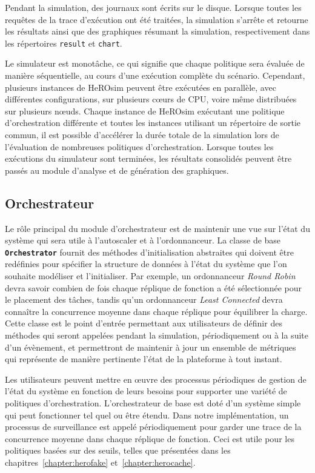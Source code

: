 Pendant la simulation, des journaux sont écrits sur le disque. Lorsque toutes les requêtes de la trace d'exécution ont été traitées, la simulation s'arrête et retourne les résultats ainsi que des graphiques résumant la simulation, respectivement dans les répertoires \texttt{result} et \texttt{chart}.

Le simulateur est monotâche, ce qui signifie que chaque politique sera évaluée de manière séquentielle, au cours d'une exécution complète du scénario. Cependant, plusieurs instances de HeROsim peuvent être exécutées en parallèle, avec différentes configurations, sur plusieurs cœurs de \gls{CPU}, voire même distribuées sur plusieurs nœuds. Chaque instance de HeROsim exécutant une politique d'orchestration différente et toutes les instances utilisant un répertoire de sortie commun, il est possible d'accélérer la durée totale de la simulation lors de l'évaluation de nombreuses politiques d'orchestration. Lorsque toutes les exécutions du simulateur sont terminées, les résultats consolidés peuvent être passés au module d'analyse et de génération des graphiques.

\subsection{Orchestrateur}

Le rôle principal du module d'orchestrateur est de maintenir une vue sur l'état du système qui sera utile à l'autoscaler et à l'ordonnanceur. La classe de base \textbf{\texttt{Orchestrator}} fournit des méthodes d'initialisation abstraites qui doivent être redéfinies pour spécifier la structure de données à l'état du système que l'on souhaite modéliser et l'initialiser. Par exemple, un ordonnanceur \textit{Round Robin} devra savoir combien de fois chaque réplique de fonction a été sélectionnée pour le placement des tâches, tandis qu'un ordonnanceur \textit{Least Connected} devra connaître la concurrence moyenne dans chaque réplique pour équilibrer la charge. Cette classe est le point d'entrée permettant aux utilisateurs de définir des méthodes qui seront appelées pendant la simulation, périodiquement ou à la suite d'un évènement, et permettront de maintenir à jour un ensemble de métriques qui représente de manière pertinente l'état de la plateforme à tout instant.

Les utilisateurs peuvent mettre en œuvre des processus périodiques de gestion de l'état du système en fonction de leurs besoins pour supporter une variété de politiques d'orchestration. L'orchestrateur de base est doté d'un système simple qui peut fonctionner tel quel ou être étendu. Dans notre implémentation, un processus de surveillance est appelé périodiquement pour garder une trace de la concurrence moyenne dans chaque réplique de fonction. Ceci est utile pour les politiques basées sur des seuils, telles que présentées dans les chapitres~\ref{chapter:herofake} et~\ref{chapter:herocache}.

